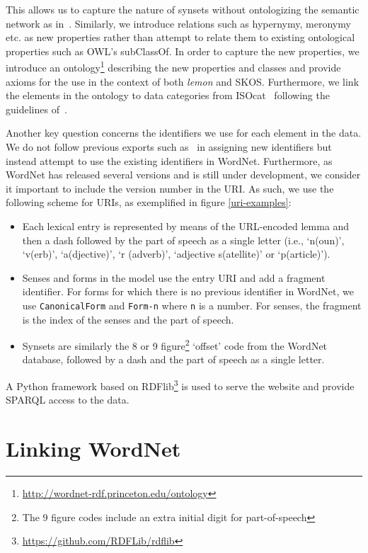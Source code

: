 \documentclass[10pt, a4paper]{article}
\newcommand{\lemon}[0]{\emph{lemon}}
\begin{document}
This allows us to capture the nature of synsets without
ontologizing the semantic network as in~\cite{gangemi2003ontowordnet}.
Similarly, we introduce relations such as hypernymy, meronymy etc. as new
properties rather than attempt to relate them to existing ontological
properties such as OWL's subClassOf. In order to capture the new properties, we
introduce an ontology\footnote{\url{http://wordnet-rdf.princeton.edu/ontology}}
describing the new properties and classes and provide
axioms for the use in the context of both \lemon{} and SKOS. Furthermore, we
link the elements in the ontology to data categories from
ISOcat~\cite{kemps2008isocat} following the guidelines
of~\cite{windhouwer2012linking}.

Another key question concerns the identifiers we use for each element in the data.
We do not follow previous exports such as~\cite{van2006conversion} in assigning new identifiers
but instead attempt to use the existing identifiers in WordNet. Furthermore, as
WordNet has released several versions and is still under development, we consider it 
important to include the version number in the URI. As such, we use the
following scheme for URIs, as exemplified in figure \ref{uri-examples}:

\begin{itemize}
  \item Each lexical entry is represented by means of the URL-encoded lemma and
    then a dash followed by the part of speech as a single letter (i.e., `n(oun)',
    `v(erb)', `a(djective)', `r (adverb)', `adjective s(atellite)' or `p(article)').
  \item Senses and forms in the model use the entry URI and add a fragment
    identifier. For forms for which there is no previous identifier in WordNet, we
    use {\tt CanonicalForm} and {\tt Form-n} where {\tt n} is a number.
    For senses, the fragment is the index of the senses and the part of
    speech.
  \item Synsets are similarly the 8 or 9 figure\footnote{The 9 figure codes
      include an extra initial digit for part-of-speech} `offset' code from the WordNet
    database, followed by a dash and the part of speech as a single letter.
\end{itemize}


A Python framework based on RDFlib\footnote{\url{https://github.com/RDFLib/rdflib}} is used to serve the website and
provide SPARQL access to the data.

\section{Linking WordNet}
\end{document}
